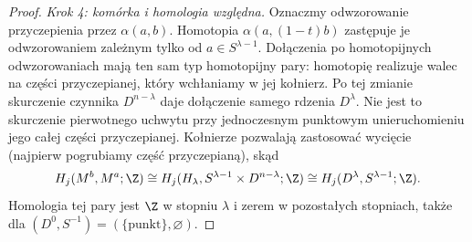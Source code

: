 \begin{proof}
\emph{Krok 4: komórka i homologia względna.}
Oznaczmy odwzorowanie przyczepienia przez $\alpha(a,b)$.
Homotopia $\alpha(a,(1-t)b)$ zastępuje je odwzorowaniem
zależnym tylko od $a\in S^{\lambda-1}$.
Dołączenia po homotopijnych odwzorowaniach mają ten sam typ
homotopijny pary: homotopię realizuje walec na części
przyczepianej, który wchłaniamy w jej kołnierz.
Po tej zmianie skurczenie czynnika $D^{n-\lambda}$
daje dołączenie samego rdzenia $D^\lambda$.
Nie jest to skurczenie pierwotnego uchwytu
przy jednoczesnym punktowym unieruchomieniu jego całej
części przyczepianej.
Kołnierze pozwalają zastosować wycięcie
(najpierw pogrubiamy część przyczepianą), skąd
\[
 H_j(M^b,M^a;\Z)
 \cong H_j(H_\lambda,S^{\lambda-1}\times D^{n-\lambda};\Z)
 \cong H_j(D^\lambda,S^{\lambda-1};\Z).
\]
Homologia tej pary jest $\Z$ w stopniu $\lambda$
i zerem w pozostałych stopniach, także dla
$(D^0,S^{-1})=(\{\mathrm{punkt}\},\varnothing)$.
\end{proof}

